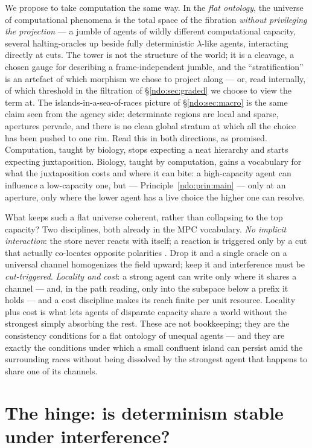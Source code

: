 We propose to take computation the same way. In the \emph{flat ontology}, the universe
of computational phenomena is the total space of the fibration \emph{without privileging
the projection} --- a jumble of agents of wildly different computational capacity,
several halting-oracles up beside fully deterministic $\lambda$-like agents,
interacting directly at cuts. The tower is not the structure of the world; it is a
cleavage, a chosen gauge for describing a frame-independent jumble, and the
``stratification'' is an artefact of which morphism we chose to project along --- or, read
internally, of which threshold in the filtration of \S\ref{ndo:sec:graded} we choose to view the term
at. The
islands-in-a-sea-of-races picture of \S\ref{ndo:sec:macro} is the same claim seen from the
agency side: determinate regions are local and sparse, apertures pervade, and there is no
clean global stratum at which all the choice has been pushed to one rim. Read this in
both directions, as promised. Computation, taught by biology, stops expecting a neat
hierarchy and starts expecting juxtaposition. Biology, taught by computation, gains a
vocabulary for what the juxtaposition costs and where it can bite: a high-capacity agent
can influence a low-capacity one, but --- Principle~\ref{ndo:prin:main} --- only at an
aperture, only where the lower agent has a live choice the higher one can resolve.

What keeps such a flat universe coherent, rather than collapsing to the top capacity?
Two disciplines, both already in the MPC vocabulary. \emph{No implicit interaction}: the
store never reacts with itself; a reaction is triggered only by a cut that actually
co-locates opposite polarities \cite{paths}. Drop it and a single oracle on a universal
channel homogenizes the field upward; keep it and interference must be \emph{cut-triggered}.
\emph{Locality and cost}: a strong agent can write only where it shares a channel ---
and, in the path reading, only into the subspace below a prefix it holds --- and a cost
discipline makes its reach finite per unit resource. Locality plus cost is what lets
agents of disparate capacity share a world without the strongest simply absorbing the
rest. These are not bookkeeping; they are the consistency conditions for a flat ontology
of unequal agents --- and they are exactly the conditions under which a small confluent
island can persist amid the surrounding races without being dissolved by the strongest
agent that happens to share one of its channels.


\section{The hinge: is determinism stable under interference?}\label{ndo:sec:crux}

